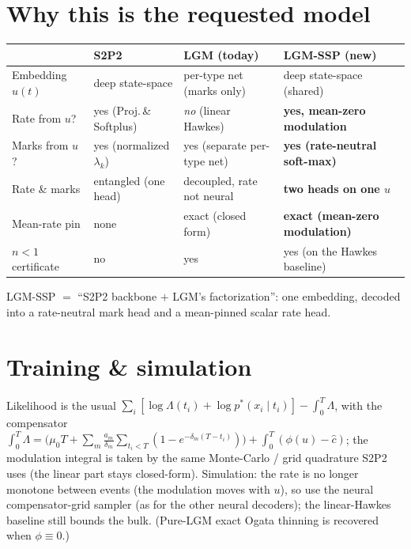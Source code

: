 \documentclass[11pt]{article}
\newcommand{\Lam}{\Lambda}
\begin{document}
\section{Why this is the requested model}
\begin{center}\small\renewcommand{\arraystretch}{1.25}
\begin{tabular}{>{\raggedright\arraybackslash}p{3.2cm}>{\raggedright\arraybackslash}p{3.5cm}>{\raggedright\arraybackslash}p{3.6cm}>{\raggedright\arraybackslash}p{3.6cm}}
\toprule
& \textbf{S2P2} & \textbf{LGM (today)} & \textbf{LGM-SSP (new)}\\
\midrule
Embedding $u(t)$ & deep state-space & per-type net (marks only) & deep state-space (shared)\\
Rate from $u$? & yes (Proj.\,\&\,Softplus) & \emph{no} (linear Hawkes) & \textbf{yes, mean-zero modulation}\\
Marks from $u$? & yes (normalized $\lambda_k$) & yes (separate per-type net) & \textbf{yes (rate-neutral soft-max)}\\
Rate \& marks & entangled (one head) & decoupled, rate not neural & \textbf{two heads on one $u$}\\
Mean-rate pin & none & exact (closed form) & \textbf{exact (mean-zero modulation)}\\
$n<1$ certificate & no & yes & yes (on the Hawkes baseline)\\
\bottomrule
\end{tabular}
\end{center}
LGM-SSP $=$ ``S2P2 backbone $+$ LGM's factorization'': one embedding, decoded into a rate-neutral mark
head and a mean-pinned scalar rate head.

\section{Training \& simulation}
Likelihood is the usual $\sum_i[\log\Lam(t_i)+\log p^*(x_i\mid t_i)]-\int_0^T\Lam$, with the compensator
$\int_0^T\Lam=\big(\mu_0 T+\sum_m\frac{a_m}{\delta_m}\sum_{t_i<T}(1-e^{-\delta_m(T-t_i)})\big)+\int_0^T(\phi(u)-\hat c)$;
the modulation integral is taken by the same Monte-Carlo / grid quadrature S2P2 uses (the linear part
stays closed-form). Simulation: the rate is no longer monotone between events (the modulation moves with
$u$), so use the neural compensator-grid sampler (as for the other neural decoders); the linear-Hawkes
baseline still bounds the bulk. (Pure-LGM exact Ogata thinning is recovered when $\phi\equiv0$.)
\end{document}
